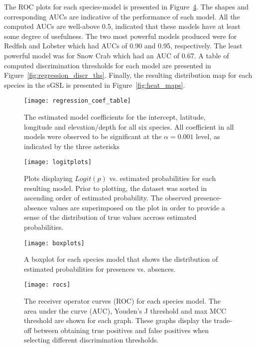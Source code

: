 The ROC plots for each species-model is presented in Figure~\ref{fig:rocs}.
The shapes and corresponding AUCs are indicative of the performance of each model.
All the computed AUCs are well-above 0.5, indicated that these models have at least some degree of usefulness.
The two most powerful models produced were for Redfish and Lobster which had AUCs of 0.90 and 0.95, respectively.
The least powerful model was for Snow Crab which had an AUC of 0.67.
A table of computed discrimination thresholds for each model are presented in Figure~\ref{fig:regression_discr_ths}.
Finally, the resulting distribution map for each species in the sGSL is presented in Figure~\ref{fig:heat_maps}.


\begin{figure}
    \texttt{[image: regression\_coef\_table]}
    \caption{
        The estimated model coefficients for the intercept, latitude, longitude and elevation/depth for all six species.
        All coefficient in all models were observed to be significant at the $\alpha=0.001$ level, as indicated by the three asterisks
    }
    \label{fig:reg_coefs}
\end{figure}




\begin{figure}
    \texttt{[image: logitplots]}
    \caption{
        Plots displaying $Logit(p)$ vs. estimated probabilities for each resulting model.
        Prior to plotting, the dataset was sorted in ascending order of estimated probability.
        The observed presence-absence values are superimposed on the plot in order to provide a sense of the
        distribution of true values accross estimated probabilities.
    }
    \label{fig:logitplots}
\end{figure}


\begin{figure}
    \texttt{[image: boxplots]}
    \caption{
        A boxplot for each species model that shows the distribution of estimated probabilities for presences vs. absences.
    }
    \label{fig:boxplots}
\end{figure}



\begin{figure}
    \texttt{[image: rocs]}
    \caption{
        The receiver operator curves (ROC) for each species model.
        The area under the curve (AUC), Youden's J threshold and max MCC threshold are shown for each graph.
        These graphs display the trade-off between obtaining true positives and false positives when selecting different discrimination thresholds.
    }
    \label{fig:rocs}
\end{figure}



